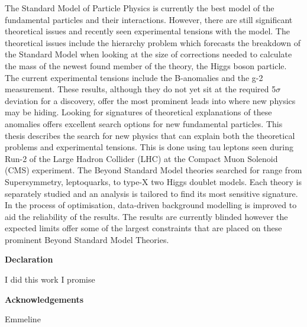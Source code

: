 \begin{titlepage}
The Standard Model of Particle Physics is currently the best model of the fundamental particles and their interactions. However, there are still significant theoretical issues and recently seen experimental tensions with the model. The theoretical issues include the hierarchy problem which forecasts the breakdown of the Standard Model when looking at the size of corrections needed to calculate the mass of the newest found member of the theory, the Higgs boson particle. The current experimental tensions include the B-anomalies and the g-2 measurement. These results, although they do not yet sit at the required 5$\sigma$ deviation for a discovery, offer the most prominent leads into where new physics may be hiding. Looking for signatures of theoretical explanations of these anomalies offers excellent search options for new fundamental particles. This thesis describes the search for new physics that can explain both the theoretical problems and experimental tensions. This is done using tau leptons seen during Run-2 of the Large Hadron Collider (LHC) at the Compact Muon Solenoid (CMS) experiment. The Beyond Standard Model theories searched for range from Supersymmetry, leptoquarks, to type-X two Higgs doublet models. Each theory is separately studied and an analysis is tailored to find its most sensitive signature. In the process of optimisation, data-driven background modelling is improved to aid the reliability of the results. The results are currently blinded however the expected limits offer some of the largest constraints that are placed on these prominent Beyond Standard Model Theories.

\newpage

\begin{center}
\Large \textbf{Declaration}
\vspace{0.5cm}
\end{center}

I did this work I promise

\newpage

\begin{center}
\Large \textbf{Acknowledgements}
\vspace{0.5cm}
\end{center}

Emmeline

\end{titlepage}